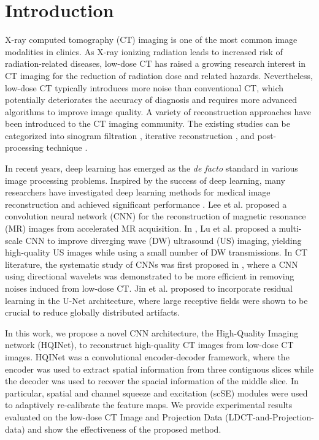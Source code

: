 \documentclass[conference]{IEEEtran}
\begin{document}
\IEEEpeerreviewmaketitle

\section{Introduction} 

X-ray computed tomography (CT) imaging is one of the most common image modalities in clinics. As X-ray ionizing radiation leads to increased risk of radiation-related diseases, low-dose CT has raised a growing research interest in CT imaging for the reduction of radiation dose and related hazards. Nevertheless, low-dose CT typically introduces more noise than conventional CT, which potentially deteriorates the accuracy of diagnosis and requires more advanced algorithms to improve image quality. A variety of reconstruction approaches have been introduced to the CT imaging community. The existing studies can be categorized into sinogram filtration \cite{manduca2009projection}, iterative reconstruction \cite{xu2012low}, and post-processing technique \cite{chen2017low}.

In recent years, deep learning has emerged as the \textit{de facto} standard in various image processing problems. Inspired by the success of deep learning, many researchers have investigated deep learning methods for medical image reconstruction and achieved significant performance \cite{schlemper2017deep, hammernik2018learning, lee2018deep, lu2018unsupervised, lu2019fast, lu2020reconstruction}. Lee et al. \cite{lee2018deep} proposed a convolution neural network (CNN) for the reconstruction of magnetic resonance (MR) images from accelerated MR acquisition. In \cite{lu2020reconstruction}, Lu et al. proposed a multi-scale CNN to improve diverging wave (DW) ultrasound (US) imaging, yielding high-quality US images while using a small number of DW transmissions. In CT literature,  the systematic study of CNNs was first proposed in \cite{kang2017deep}, where a CNN using directional wavelets was demonstrated to be more efficient in removing noises induced from low-dose CT. Jin et al. \cite{jin2017deep} proposed to incorporate residual learning in the U-Net architecture, where large receptive fields were shown to be crucial to reduce globally distributed artifacts.

In this work, we propose a novel CNN architecture, the High-Quality Imaging network (HQINet), to reconstruct high-quality CT images from low-dose CT images. HQINet was a convolutional encoder-decoder framework, where the encoder was used to extract spatial information from three contiguous slices while the decoder was used to recover the spacial information of the middle slice. In particular, spatial and channel squeeze and excitation (scSE) modules were used to adaptively re-calibrate the feature maps. We provide experimental results evaluated on the low-dose CT Image and Projection Data (LDCT-and-Projection-data) \cite{mcCollough2020data} and show the effectiveness of the proposed method.
\end{document}

